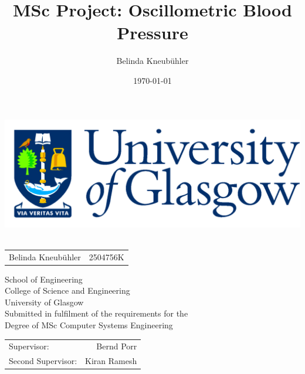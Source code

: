 \documentclass[12pt,titlepage,oneside]{book}
\title{MSc Project: Oscillometric Blood Pressure}
\author{Belinda Kneubühler}
\date{\today}
\newcommand{\stdNbr}{2504756K}
\newcommand{\course}{MSc Computer Systems Engineering}
\begin{document}
\lstset{language=C++}

\begin{titlepage}
\centering

\includegraphics[scale=0.125]{GlaLogo.pdf}\\
\vspace{1cm}
\bfseries\Large
\thetitle\\


\vspace*{\fill}
\begin{tabular}{c c}
Belinda Kneubühler & \stdNbr\\
\end{tabular}

\normalfont\large
\vspace{1cm}
School of Engineering\\
College of Science and Engineering\\
University of Glasgow\\

\vspace{1cm}
Submitted in fulfilment of the requirements for the\\
Degree of \course\\
\vspace{1cm}
\begin{flushleft}
\begin{tabular}{l r}
Supervisor: & Bernd Porr\\
Second Supervisor: & Kiran Ramesh\\
\end{tabular}
\end{flushleft}

\thedate

\end{titlepage}
\frontmatter  %

\tableofcontents
\listoftables
\listoffigures



\mainmatter %





\appendix


\backmatter  %


\end{document}
